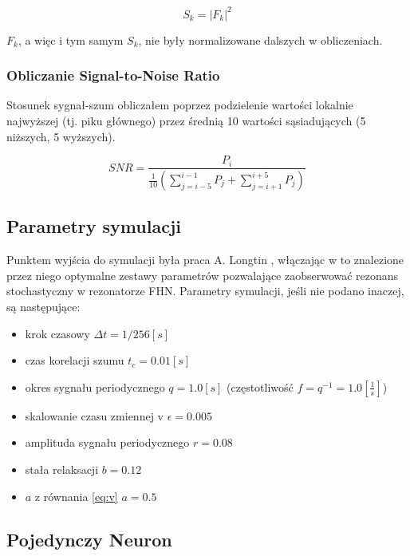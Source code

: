   \begin{equation}
    S_k = |F_k|^2
  \end{equation}

  $F_k$, a więc i tym samym $S_k$, nie były normalizowane dalszych w obliczeniach.

  \subsubsection{Obliczanie Signal-to-Noise Ratio}

  Stosunek sygnał-szum obliczałem poprzez podzielenie wartości lokalnie najwyższej (tj. piku głównego) przez średnią 10 wartości sąsiadujących (5 niższych, 5 wyższych).

  \begin{equation}
    SNR = \frac{P_i}{\frac{1}{10} \left ( \sum\limits^{i-1}_{j=i-5} P_j + \sum\limits^{i+5}_{j=i+1} P_j \right )}
  \end{equation}

  \subsection{Parametry symulacji}
  \label{sec:parametry}

  Punktem wyjścia do symulacji była praca A. Longtin \cite{longtin}, włączając w to znalezione przez niego optymalne zestawy parametrów pozwalające zaobserwować rezonans stochastyczny w rezonatorze FHN. Parametry symulacji, jeśli nie podano inaczej, są następujące:

  \begin{itemize}
    \item krok czasowy $\Delta t = 1/256 [s]$
    \item czas korelacji szumu $t_c = 0.01 [s]$
    \item okres sygnału periodycznego $q=1.0 [s]$ (częstotliwość $f=q^{-1}=1.0 [\frac{1}{s}]$)
    \item skalowanie czasu zmiennej v $\epsilon = 0.005$
    \item amplituda sygnału periodycznego $r=0.08$
    \item stała relaksacji $b=0.12$
    \item $a$ z równania \ref{eq:v} $a=0.5$
  \end{itemize}

  \subsection{Pojedynczy Neuron}
  
